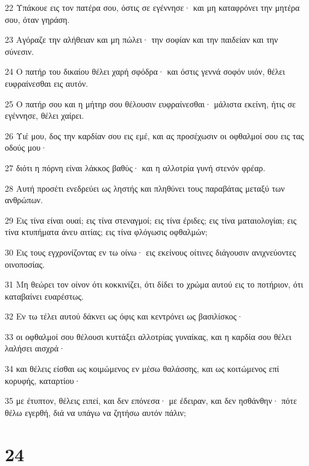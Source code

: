 \par 22 Υπάκουε εις τον πατέρα σου, όστις σε εγέννησε· και μη καταφρόνει την μητέρα σου, όταν γηράση.
\par 23 Αγόραζε την αλήθειαν και μη πώλει· την σοφίαν και την παιδείαν και την σύνεσιν.
\par 24 Ο πατήρ του δικαίου θέλει χαρή σφόδρα· και όστις γεννά σοφόν υιόν, θέλει ευφραίνεσθαι εις αυτόν.
\par 25 Ο πατήρ σου και η μήτηρ σου θέλουσιν ευφραίνεσθαι· μάλιστα εκείνη, ήτις σε εγέννησε, θέλει χαίρει.
\par 26 Υιέ μου, δος την καρδίαν σου εις εμέ, και ας προσέχωσιν οι οφθαλμοί σου εις τας οδούς μου·
\par 27 διότι η πόρνη είναι λάκκος βαθύς· και η αλλοτρία γυνή στενόν φρέαρ.
\par 28 Αυτή προσέτι ενεδρεύει ως ληστής και πληθύνει τους παραβάτας μεταξύ των ανθρώπων.
\par 29 Εις τίνα είναι ουαί; εις τίνα στεναγμοί; εις τίνα έριδες; εις τίνα ματαιολογίαι; εις τίνα κτυπήματα άνευ αιτίας; εις τίνα φλόγωσις οφθαλμών;
\par 30 Εις τους εγχρονίζοντας εν τω οίνω· εις εκείνους οίτινες διάγουσιν ανιχνεύοντες οινοποσίας.
\par 31 Μη θεώρει τον οίνον ότι κοκκινίζει, ότι δίδει το χρώμα αυτού εις το ποτήριον, ότι καταβαίνει ευαρέστως.
\par 32 Εν τω τέλει αυτού δάκνει ως όφις και κεντρόνει ως βασιλίσκος·
\par 33 οι οφθαλμοί σου θέλουσι κυττάξει αλλοτρίας γυναίκας, και η καρδία σου θέλει λαλήσει αισχρά·
\par 34 και θέλεις είσθαι ως κοιμώμενος εν μέσω θαλάσσης, και ως κοιτώμενος επί κορυφής, καταρτίου·
\par 35 με έτυπτον, θέλεις ειπεί, και δεν επόνεσα· με έδειραν, και δεν ησθάνθην· πότε θέλω εγερθή, διά να υπάγω να ζητήσω αυτόν πάλιν;

\chapter{24}

